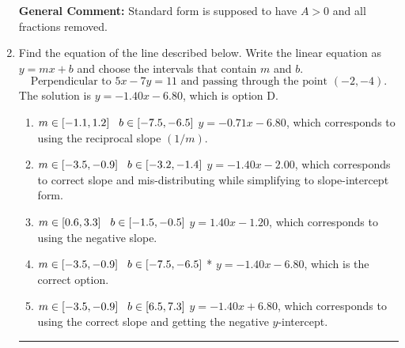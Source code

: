 \documentclass{extbook}[14pt]
\newcommand{\litem}[1]{\item #1

\rule{\textwidth}{0.4pt}}
\begin{document}
\begin{enumerate}
{\textbf{General Comment:} Standard form is supposed to have $A > 0$ and all fractions removed.
}
\litem{
Find the equation of the line described below. Write the linear equation as $ y=mx+b $ and choose the intervals that contain $m$ and $b$.
\[ \text{Perpendicular to } 5 x - 7 y = 11 \text{ and passing through the point } (-2, -4). \]
The solution is \( y = -1.40x - 6.80 \), which is option D.\begin{enumerate}[label=\Alph*.]
\item \( m \in [-1.1, 1.2] \hspace*{3mm} b \in [-7.5, -6.5] \)
 $y = -0.71x - 6.80$, which corresponds to using the reciprocal slope $(1/m)$.
\item \( m \in [-3.5, -0.9] \hspace*{3mm} b \in [-3.2, -1.4] \)
 $y = -1.40x - 2.00$, which corresponds to correct slope and mis-distributing while simplifying to slope-intercept form.
\item \( m \in [0.6, 3.3] \hspace*{3mm} b \in [-1.5, -0.5] \)
 $y = 1.40x - 1.20$, which corresponds to using the negative slope.
\item \( m \in [-3.5, -0.9] \hspace*{3mm} b \in [-7.5, -6.5] \)
* $y = -1.40x - 6.80$, which is the correct option.
\item \( m \in [-3.5, -0.9] \hspace*{3mm} b \in [6.5, 7.3] \)
 $y = -1.40x + 6.80$, which corresponds to using the correct slope and getting the negative $y$-intercept.
\end{enumerate}

}
\end{enumerate}
\end{document}
